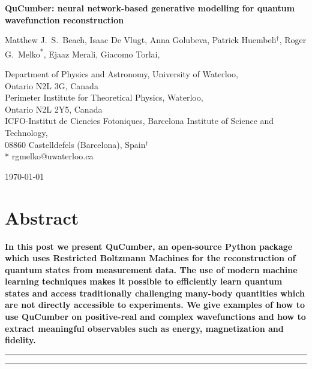 \documentclass[submission, Phys]{SciPost}
\begin{document}
\begin{center}{\Large \textbf{
			QuCumber: neural network-based generative modelling for quantum wavefunction reconstruction
		}}\end{center}

\begin{center}
	Matthew J.~S.~Beach,
	Isaac De Vlugt,
	Anna Golubeva,
	Patrick Huembeli$^\dag$,
	Roger G.~Melko\textsuperscript{*},
	Ejaaz Merali,
	Giacomo Torlai,
\end{center}

\begin{center}
	Department of Physics and Astronomy, University of Waterloo,
	\\Ontario N2L 3G, Canada
	\\
	Perimeter Institute for Theoretical Physics, Waterloo,
	\\Ontario N2L 2Y5, Canada
	\\
	ICFO-Institut de Ciencies Fotoniques, Barcelona Institute of Science and Technology,
	\\08860 Castelldefels (Barcelona), Spain$^\dag$ \\
	* rgmelko@uwaterloo.ca \\
\end{center}

\begin{center}
	\today
\end{center}


\section*{Abstract}
{\bf
	In this post we present QuCumber, an open-source Python package which uses Restricted Boltzmann Machines for the reconstruction of quantum states from measurement data. 
    The use of modern machine learning techniques makes it possible to efficiently learn quantum states and access traditionally challenging many-body quantities which are not directly accessible to experiments. 
    We give examples of how to use QuCumber on positive-real and complex wavefunctions and how to extract meaningful observables such as energy, magnetization and fidelity.
}

\vspace{10pt}
\noindent\rule{\textwidth}{1pt}
\tableofcontents\thispagestyle{fancy}
\noindent\rule{\textwidth}{1pt}
\vspace{10pt}
\end{document}
